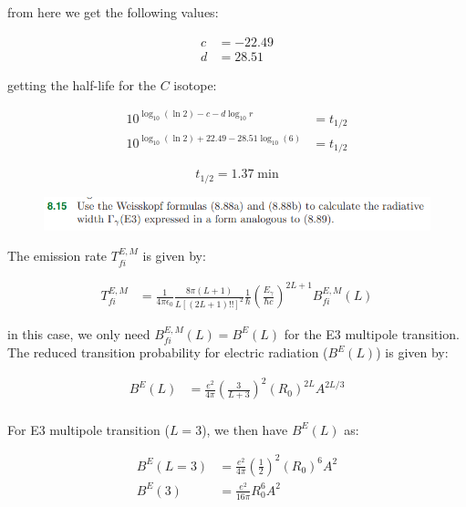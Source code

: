 \documentclass[11pt]{article}
\theoremstyle{definition}
\begin{document}
from here we get the following values:

\begin{align}
    c &= -22.49 \\
    d &= 28.51 
\end{align}

getting the half-life for the $C$ isotope:

\begin{align}
    10^{\log_{10}(\ln 2) -c - d \log_{10} r}  &= t_{1/2}\\
    10^{\log_{10}(\ln 2) + 22.49 - 28.51 \log_{10}(6)}  &= t_{1/2}
\end{align}

\begin{equation}
\boxed{
    t_{1/2} = 1.37\;\text{min}
}
\end{equation}
\newpage

\begin{figure}[h!]
    \centering
    \includegraphics[scale = 0.55]{8.15.png}
\end{figure}

The emission rate $T_{fi}^{E,M}$ is given by:

\begin{align}
    T_{fi}^{E,M} &= \frac{1}{4\pi\epsilon_0} \frac{8\pi (L+1)}{L[(2L+1)!!]^2} \frac{1}{\hbar} \left(\frac{E_{\gamma}}{\hbar c}\right)^{2L+1} B_{fi}^{E,M}(L)
\end{align}

in this case, we only need $B_{fi}^{E,M}(L) = B^E (L)$ for the E3 multipole transition. The reduced transition probability for electric radiation ($B^E (L)$) is given by:

\begin{align}
    B^E (L) &= \frac{e^2}{4\pi} \left(\frac{3}{L+3}\right)^2 (R_0)^{2L} A^{2L/3}\\
\end{align}

For E3 multipole transition ($L=3$), we then have $B^E (L)$ as:

\begin{align}
    B^E (L=3) &= \frac{e^2}{4\pi} \left(\frac{1}{2}\right)^2 (R_0)^{6} A^{2}\\
    B^E (3) &= \frac{e^2}{16\pi}R_0^{6} A^{2}
\end{align}
\end{document}
